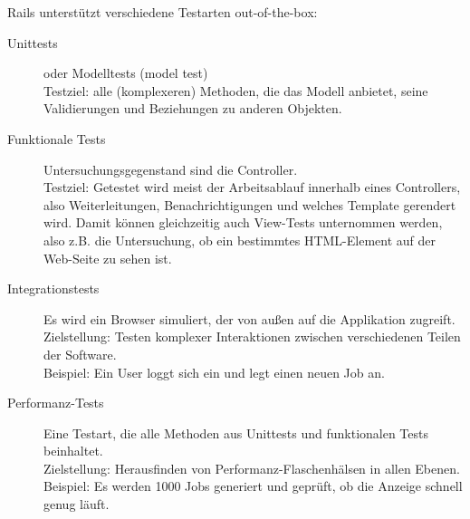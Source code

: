 Rails unterstützt verschiedene Testarten out-of-the-box:
\begin{description}
 \item[Unittests] oder Modelltests (model test)\\
 Testziel: alle (komplexeren) Methoden, die das Modell anbietet, seine Validierungen und Beziehungen zu anderen Objekten.
 \item[Funktionale Tests] Untersuchungsgegenstand sind die Controller. \\
 Testziel: Getestet wird meist der Arbeitsablauf innerhalb eines Controllers, also Weiterleitungen, Benachrichtigungen und welches Template gerendert wird.
 Damit können gleichzeitig auch View-Tests unternommen werden, also z.B. die Untersuchung, ob ein bestimmtes HTML-Element auf der Web-Seite zu sehen ist.
 \item[Integrationstests] Es wird ein Browser simuliert, der von außen auf die Applikation zugreift.
 Zielstellung: Testen komplexer Interaktionen zwischen verschiedenen Teilen der Software.\\
 Beispiel: Ein User loggt sich ein und legt einen neuen Job an.
 \item[Performanz-Tests] Eine Testart, die alle Methoden aus Unittests und funktionalen Tests beinhaltet.\\
 Zielstellung: Herausfinden von Performanz-Flaschenhälsen in allen Ebenen. \\
 Beispiel: Es werden 1000 Jobs generiert und geprüft, ob die Anzeige schnell genug läuft.
\end{description}
